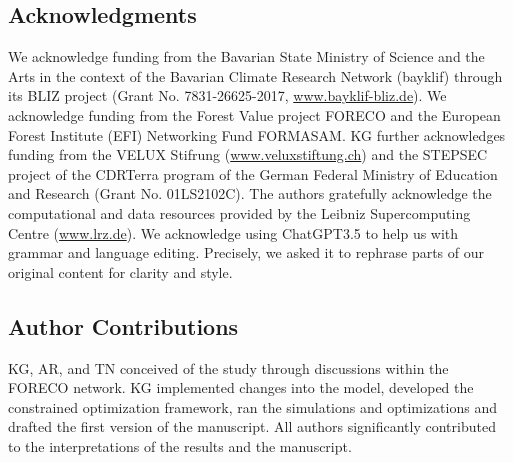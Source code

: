 \documentclass[]{article}
\begin{document}


\subsection*{Acknowledgments}
We acknowledge funding from the Bavarian State Ministry of Science and the Arts in the context of the Bavarian Climate Research Network (bayklif) through its BLIZ project (Grant No. 7831-26625-2017, \url{www.bayklif-bliz.de}). We acknowledge funding from the Forest Value project FORECO and the European Forest Institute (EFI) Networking Fund FORMASAM. KG further acknowledges funding from the VELUX Stifrung (\url{www.veluxstiftung.ch}) and the STEPSEC project of the CDRTerra program of the German Federal Ministry of Education and Research (Grant No. 01LS2102C).
The authors gratefully acknowledge the computational and data resources provided by the Leibniz Supercomputing Centre (\url{www.lrz.de}).
We acknowledge using ChatGPT3.5 to help us with grammar and language editing.
Precisely, we asked it to rephrase parts of our original content for clarity and style.

\subsection*{Author Contributions}
KG, AR, and TN conceived of the study through discussions within the FORECO network. KG implemented changes into the model, developed the constrained optimization framework, ran the simulations and optimizations and drafted the first version of the manuscript. All authors significantly contributed to the interpretations of the results and the manuscript.




\printbibliography




\end{document}
